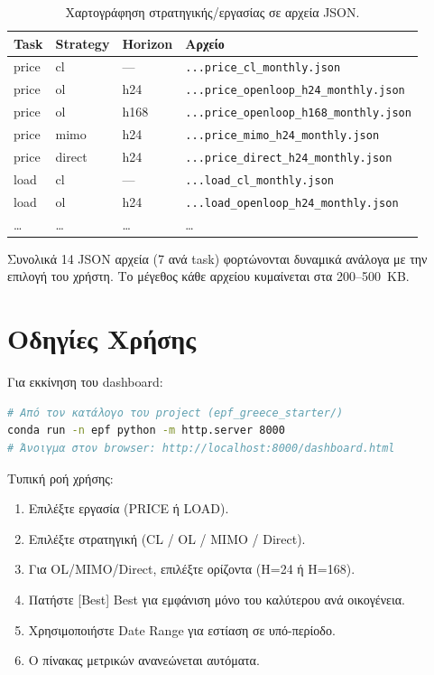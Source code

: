 \begin{table}[htbp]
\centering\small
\caption{Χαρτογράφηση στρατηγικής/εργασίας σε αρχεία JSON.}
\label{tab:dash_filemap}
\begin{tabular}{lllp{5.5cm}}
\toprule
\textbf{Task} & \textbf{Strategy} & \textbf{Horizon} & \textbf{Αρχείο} \\
\midrule
price & cl & — & \texttt{...price\_cl\_monthly.json} \\
price & ol & h24 & \texttt{...price\_openloop\_h24\_monthly.json} \\
price & ol & h168 & \texttt{...price\_openloop\_h168\_monthly.json} \\
price & mimo & h24 & \texttt{...price\_mimo\_h24\_monthly.json} \\
price & direct & h24 & \texttt{...price\_direct\_h24\_monthly.json} \\
load  & cl & — & \texttt{...load\_cl\_monthly.json} \\
load  & ol & h24 & \texttt{...load\_openloop\_h24\_monthly.json} \\
\ldots & \ldots & \ldots & \ldots \\
\bottomrule
\end{tabular}
\end{table}

Συνολικά 14 JSON αρχεία (7 ανά task) φορτώνονται δυναμικά ανάλογα με την
επιλογή του χρήστη. Το μέγεθος κάθε αρχείου κυμαίνεται στα 200--500~KB.

\section{Οδηγίες Χρήσης}
\label{sec:dash_usage}

Για εκκίνηση του dashboard:
\begin{lstlisting}[language=bash]
# Από τον κατάλογο του project (epf_greece_starter/)
conda run -n epf python -m http.server 8000
# Άνοιγμα στον browser: http://localhost:8000/dashboard.html
\end{lstlisting}

\noindent Τυπική ροή χρήσης:
\begin{enumerate}
    \item Επιλέξτε εργασία (PRICE ή LOAD).
    \item Επιλέξτε στρατηγική (CL / OL / MIMO / Direct).
    \item Για OL/MIMO/Direct, επιλέξτε ορίζοντα (H=24 ή H=168).
    \item Πατήστε [Best] Best για εμφάνιση μόνο του καλύτερου ανά οικογένεια.
    \item Χρησιμοποιήστε Date Range για εστίαση σε υπό-περίοδο.
    \item Ο πίνακας μετρικών ανανεώνεται αυτόματα.
\end{enumerate}
